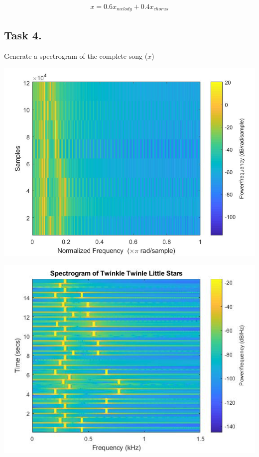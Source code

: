 \documentclass{article}
\begin{document}
        \begin{align*}
            x=0.6x_{melody}+0.4x_{chorus}
        \end{align*}
        
        
    \subsection{Task 4.} Generate a spectrogram of the complete song ($x$)\\
        \vspace{5mm}
        \begin{center}
            \includegraphics[scale=0.25]{task4.jpg}
        \end{center}
        \begin{center}
            \includegraphics[width=\textwidth]{task4b.jpg}
        \end{center}
\end{document}

